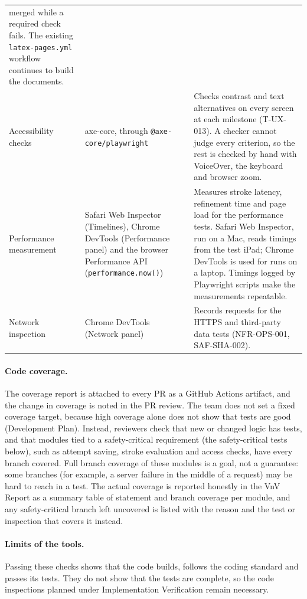 \documentclass[12pt, titlepage]{article}
\begin{document}
{\begin{longtable}{@{}>{\raggedright\arraybackslash}p{}>{\raggedright\arraybackslash}p{}>{\raggedright\arraybackslash}p{}@{}}
merged while a required check fails. The existing
\texttt{latex-pages.yml} workflow continues to build the documents.\\
\addlinespace
Accessibility checks & axe-core, through \texttt{@axe-core/\allowbreak playwright}
& Checks contrast and text alternatives on every screen at each milestone
(T-UX-013). A checker cannot judge every criterion, so the rest is checked by
hand with VoiceOver, the keyboard and browser zoom.\\
\addlinespace
Performance measurement & Safari Web Inspector (Timelines), Chrome
DevTools (Performance panel) and the browser Performance API
(\texttt{performance.\allowbreak now()}) & Measures stroke latency, refinement time and
page load for the performance tests. Safari Web Inspector, run on a Mac, reads
timings from the test iPad; Chrome DevTools is used for runs on a laptop.
Timings logged by Playwright scripts make the measurements repeatable.\\
\addlinespace
Network inspection & Chrome DevTools (Network panel) & Records requests for
the HTTPS and third-party data tests (NFR-OPS-001, SAF-SHA-002).\\
\bottomrule
\end{longtable}}

\paragraph{Code coverage.} The coverage report is attached to every PR as a
GitHub Actions artifact, and the change in coverage is noted in the PR
review. The team does not set a fixed coverage target, because high coverage
alone does not show that tests are good (Development Plan). Instead, reviewers
check that new or changed logic has tests, and that modules tied to a
safety-critical requirement (the safety-critical tests below), such as
attempt saving, stroke evaluation and access checks, have every branch
covered. Full branch coverage of these modules is a goal, not a guarantee:
some branches (for example, a server failure in the middle of a request) may be
hard to reach in a test. The actual coverage is reported honestly in the VnV
Report as a summary table of statement and branch coverage per module, and any
safety-critical branch left uncovered is listed with the reason and the test or
inspection that covers it instead.

\paragraph{Limits of the tools.} Passing these checks shows that the code
builds, follows the coding standard and passes its tests. They do not show that the tests are complete, so the code inspections planned under Implementation
Verification remain necessary.
\end{document}
